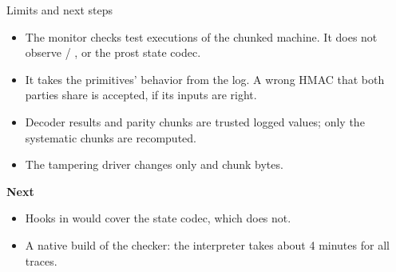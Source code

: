 \begin{frame}[t]{Limits and next steps}
  \footnotesize
  \vspace{0.2em}
  \begin{itemize}\footnotesize
    \item The monitor checks test executions of the chunked  machine. It does not
      observe   / ,  or the prost state codec.
    \item It takes the primitives' behavior from the log. A wrong HMAC that both parties share
      is accepted, if its inputs are right.
    \item Decoder results and parity chunks are trusted logged values; only the systematic
      chunks are recomputed.
    \item The tampering driver changes only  and  chunk bytes.
  \end{itemize}
  \vspace{0.2em}
  \textbf{Next}
  \begin{itemize}\footnotesize
    \item Hooks in  would cover the state codec, which  does not.
    \item A native build of the checker: the interpreter takes about 4 minutes for all traces.
  \end{itemize}
\end{frame}



